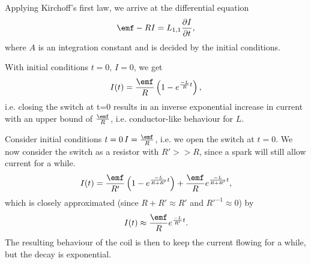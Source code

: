 \documentclass[a4paper, 12pt]{article}
\begin{document}
            Applying Kirchoff's first law, we arrive at the differential equation
            \begin{equation}
                \emf - RI = L_{1,1}\frac{\partial I}{\partial t},
            \end{equation}
            where $A$ is an integration constant and is decided by the initial conditions.

            With initial conditions $t=0,\, I=0$, we get 
            \begin{equation}
                I(t) = \frac{\emf}{R}\left(1-e^{\frac{-L}{R}t}\right),
            \end{equation}
            i.e. closing the switch at t=0 results in an inverse exponential increase in current 
            with an upper bound of $\frac{\emf}{R}$, i.e. conductor-like behaviour for $L$.

            Consider initial conditions $t=0\, I = \frac{\emf}{R}$, i.e. we open the switch at $t=0$.
            We now consider the switch as a resistor with $R' >> R$, since a spark will still allow current for a while.
            \begin{equation}
                I(t) = \frac{\emf}{R'}\left(1-e^{\frac{-L}{R+R'}t}\right) + \frac{\emf}{R} e^{\frac{-L}{R+R'}t},
            \end{equation}
            which is closely approximated (since $R+R' \approx R'$ and $R'^{-1} \approx 0$) by
            \begin{equation}
                I(t) \approx \frac{\emf}{R}e^{\frac{-L}{R'}t}.
            \end{equation}
            The resulting behaviour of the coil is then to keep the current flowing for a while, but the decay is exponential.
\end{document}
